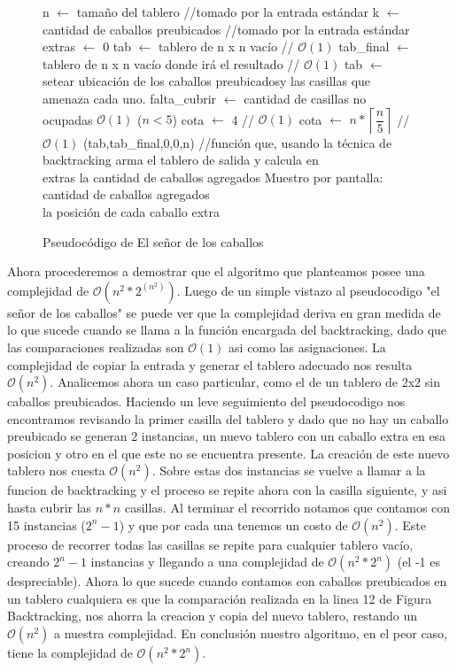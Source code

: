 \begin{figure}
\begin{codebox}
\li n $\leftarrow$ tamaño del tablero //tomado por la entrada estándar
\li k $\leftarrow$ cantidad de caballos preubicados //tomado por la entrada estándar
\li extras $\leftarrow$ 0
\li tab $\leftarrow$ tablero de n x n vacío // $\mathcal{O}(1)$
\li tab_final $\leftarrow$ tablero de n x n vacío donde irá el resultado // $\mathcal{O}(1)$
\li tab $\leftarrow$ setear ubicación de los caballos preubicadosy las casillas que amenaza cada uno.
\li falta_cubrir $\leftarrow$ cantidad de casillas no ocupadas $\mathcal{O}(1)$
\li \If ($n < 5$)
\li \quad cota $\leftarrow$ 4  // $\mathcal{O}(1)$
\li \Else
\li \quad cota $\leftarrow$ $n*\left \lceil \dfrac{n}{5} \right \rceil$   // $\mathcal{O}(1)$
(tab,tab_final,0,0,n)
\li //función que, usando la técnica de backtracking arma el tablero de salida y calcula en\\ extras la cantidad de caballos agregados
\li Muestro por pantalla: cantidad de caballos agregados\\la posición de cada caballo extra
\end{codebox}
\caption{Pseudocódigo de El señor de los caballos}\label{code:caballos}
\end{figure}
\FloatBarrier

Ahora procederemos a demostrar que el algoritmo que planteamos posee una complejidad de $\mathcal{O}(n^2*2^(n^2))$. Luego de un simple vistazo al pseudocodigo "el señor de los caballos" se puede ver que la complejidad deriva en gran medida de lo que sucede cuando se llama a la función encargada del backtracking, dado que las comparaciones realizadas son $\mathcal{O}(1)$ asi como las asignaciones. La complejidad de copiar la entrada y generar el tablero adecuado nos resulta $\mathcal{O}(n^2)$.
Analicemos ahora un caso particular, como el de un tablero de 2x2 sin caballos preubicados. Haciendo un leve seguimiento del pseudocodigo nos encontramos revisando la primer casilla del tablero y dado que no hay un caballo preubicado se generan 2 instancias, un nuevo tablero con un caballo extra en esa posicion y otro en el que este no se encuentra presente. La creación de este nuevo tablero nos cuesta $\mathcal{O}(n^2)$. Sobre estas dos instancias se vuelve a llamar a la funcion de backtracking y el proceso se repite ahora con la casilla siguiente, y asi hasta cubrir las $n*n$ casillas. Al terminar el recorrido notamos que contamos con 15 instancias ($2^n - 1$) y que por cada una tenemos un costo de $\mathcal{O}(n^2)$.
Este proceso de recorrer todas las casillas se repite para cualquier tablero vacío, creando $2^n -1$ instancias y llegando a una complejidad de $\mathcal{O}(n^2*2^n)$ (el -1 es despreciable).
Ahora lo que sucede cuando contamos con caballos preubicados en un tablero cualquiera es que la comparación realizada en la linea 12 de Figura Backtracking, nos ahorra la creacion y copia del nuevo tablero, restando un $\mathcal{O}(n^2)$ a nuestra complejidad.
En conclusión nuestro algoritmo, en el peor caso, tiene la complejidad de $\mathcal{O}(n^2*2^n)$.

